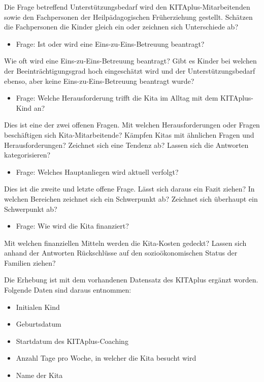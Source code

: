 \documentclass[
  ngerman,
  11pt,
  paper=a4,
  twoside,
  titlepage=true,
  openright,
  abstract=on,
  toc=listofnumbered,
  numbers=noenddot,
  chapterprefix=true,
  headings=optiontohead,
  svgnames,
  dvipsnames]{scrreprt}
\providecommand{\tightlist}{%
  \setlength{\itemsep}{0pt}\setlength{\parskip}{0pt}}
\begin{document}
Die Frage betreffend Unterstützungsbedarf wird den
KITAplus-Mitarbeitenden sowie den Fachpersonen der Heilpädagogischen
Früherziehung gestellt. Schätzen die Fachpersonen die Kinder gleich ein
oder zeichnen sich Unterschiede ab?

\begin{itemize}
\tightlist
\item
  Frage: Ist oder wird eine Eins-zu-Eins-Betreuung beantragt?
\end{itemize}

Wie oft wird eine Eins-zu-Eins-Betreuung beantragt? Gibt es Kinder bei
welchen der Beeinträchtigungsgrad hoch eingeschätzt wird und der
Unterstützungsbedarf ebenso, aber keine Eins-zu-Eins-Betreuung beantragt
wurde?

\begin{itemize}
\tightlist
\item
  Frage: Welche Herausforderung trifft die Kita im Alltag mit dem
  KITAplus-Kind an?
\end{itemize}

Dies ist eine der zwei offenen Fragen. Mit welchen Herausforderungen
oder Fragen beschäftigen sich Kita-Mitarbeitende? Kämpfen Kitas mit
ähnlichen Fragen und Herausforderungen? Zeichnet sich eine Tendenz ab?
Lassen sich die Antworten kategorisieren?

\begin{itemize}
\tightlist
\item
  Frage: Welches Hauptanliegen wird aktuell verfolgt?
\end{itemize}

Dies ist die zweite und letzte offene Frage. Lässt sich daraus ein Fazit
ziehen? In welchen Bereichen zeichnet sich ein Schwerpunkt ab? Zeichnet
sich überhaupt ein Schwerpunkt ab?

\begin{itemize}
\tightlist
\item
  Frage: Wie wird die Kita finanziert?
\end{itemize}

Mit welchen finanziellen Mitteln werden die Kita-Kosten gedeckt? Lassen
sich anhand der Antworten Rückschlüsse auf den sozioökonomischen Status
der Familien ziehen?

Die Erhebung ist mit dem vorhandenen Datensatz des KITAplus ergänzt
worden. Folgende Daten sind daraus entnommen:

\begin{itemize}
\tightlist
\item
  Initialen Kind
\item
  Geburtsdatum
\item
  Startdatum des KITAplus-Coaching
\item
  Anzahl Tage pro Woche, in welcher die Kita besucht wird
\item
  Name der Kita
\end{itemize}
\end{document}
